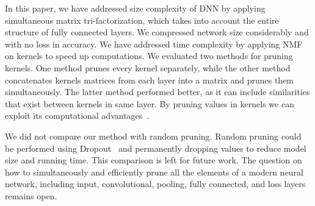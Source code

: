 \documentclass{article} %
\begin{document}
In this paper, we have addressed size complexity of DNN by applying simultaneous matrix 
tri-factorization, which takes into account the entire structure of fully connected 
layers. We compressed network size considerably and with no loss in accuracy. We have 
addressed time complexity by applying NMF on kernels to speed up computations. We 
evaluated two methods for pruning kernels. One method prunes every kernel separately, 
while the other method concatenates kernels matrices from each layer into a matrix and 
prunes them simultaneously. The latter method performed better, as it can include 
similarities that exist between kernels in same layer. By pruning values in kernels we can
exploit its computational advantages~\cite{anwar2015structured}.

We did not compare our method with random pruning. Random pruning could be performed using
Dropout~\cite{srivastava2014dropout} and permanently dropping values to reduce model size 
and running time. This comparison is left for future work. The question on how to 
simultaneously and efficiently prune all the elements of a modern neural network, 
including input, convolutional, pooling, fully connected, and loss layers remains open.





\todos
\end{document}

